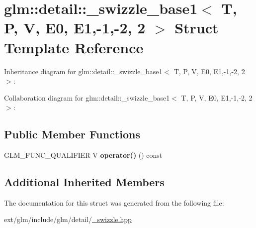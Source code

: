 \hypertarget{structglm_1_1detail_1_1__swizzle__base1_3_01_t_00_01_p_00_01_v_00_01_e0_00_01_e1_00-1_00-2_00_012_01_4}{\section{glm\-:\-:detail\-:\-:\-\_\-swizzle\-\_\-base1$<$ T, P, V, E0, E1,-\/1,-\/2, 2 $>$ Struct Template Reference}
\label{structglm_1_1detail_1_1__swizzle__base1_3_01_t_00_01_p_00_01_v_00_01_e0_00_01_e1_00-1_00-2_00_012_01_4}
}


Inheritance diagram for glm\-:\-:detail\-:\-:\-\_\-swizzle\-\_\-base1$<$ T, P, V, E0, E1,-\/1,-\/2, 2 $>$\-:


Collaboration diagram for glm\-:\-:detail\-:\-:\-\_\-swizzle\-\_\-base1$<$ T, P, V, E0, E1,-\/1,-\/2, 2 $>$\-:
\subsection*{Public Member Functions}
\begin{DoxyCompactItemize}
\item 
\hypertarget{structglm_1_1detail_1_1__swizzle__base1_3_01_t_00_01_p_00_01_v_00_01_e0_00_01_e1_00-1_00-2_00_012_01_4_a333b1c869374c290a8bca707a258f5e5}{G\-L\-M\-\_\-\-F\-U\-N\-C\-\_\-\-Q\-U\-A\-L\-I\-F\-I\-E\-R V {\bfseries operator()} () const }\label{structglm_1_1detail_1_1__swizzle__base1_3_01_t_00_01_p_00_01_v_00_01_e0_00_01_e1_00-1_00-2_00_012_01_4_a333b1c869374c290a8bca707a258f5e5}

\end{DoxyCompactItemize}
\subsection*{Additional Inherited Members}


The documentation for this struct was generated from the following file\-:\begin{DoxyCompactItemize}
\item 
ext/glm/include/glm/detail/\hyperlink{__swizzle_8hpp}{\-\_\-swizzle.\-hpp}\end{DoxyCompactItemize}
